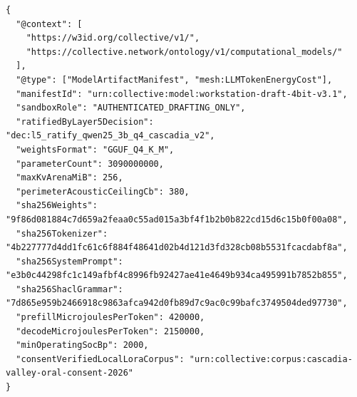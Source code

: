 \begin{lstlisting}[language=jsonld,label={lst:jsonld-model-manifest},caption={Ratified Layer~6 \texttt{ModelArtifactManifest} binding SHA-256 supply-chain hashes and integer \texttt{uJ} \texttt{LLMTokenEnergyCost} bounds.}]
{
  "@context": [
    "https://w3id.org/collective/v1/",
    "https://collective.network/ontology/v1/computational_models/"
  ],
  "@type": ["ModelArtifactManifest", "mesh:LLMTokenEnergyCost"],
  "manifestId": "urn:collective:model:workstation-draft-4bit-v3.1",
  "sandboxRole": "AUTHENTICATED_DRAFTING_ONLY",
  "ratifiedByLayer5Decision": "dec:l5_ratify_qwen25_3b_q4_cascadia_v2",
  "weightsFormat": "GGUF_Q4_K_M",
  "parameterCount": 3090000000,
  "maxKvArenaMiB": 256,
  "perimeterAcousticCeilingCb": 380,
  "sha256Weights": "9f86d081884c7d659a2feaa0c55ad015a3bf4f1b2b0b822cd15d6c15b0f00a08",
  "sha256Tokenizer": "4b227777d4dd1fc61c6f884f48641d02b4d121d3fd328cb08b5531fcacdabf8a",
  "sha256SystemPrompt": "e3b0c44298fc1c149afbf4c8996fb92427ae41e4649b934ca495991b7852b855",
  "sha256ShaclGrammar": "7d865e959b2466918c9863afca942d0fb89d7c9ac0c99bafc3749504ded97730",
  "prefillMicrojoulesPerToken": 420000,
  "decodeMicrojoulesPerToken": 2150000,
  "minOperatingSocBp": 2000,
  "consentVerifiedLocalLoraCorpus": "urn:collective:corpus:cascadia-valley-oral-consent-2026"
}
\end{lstlisting}
